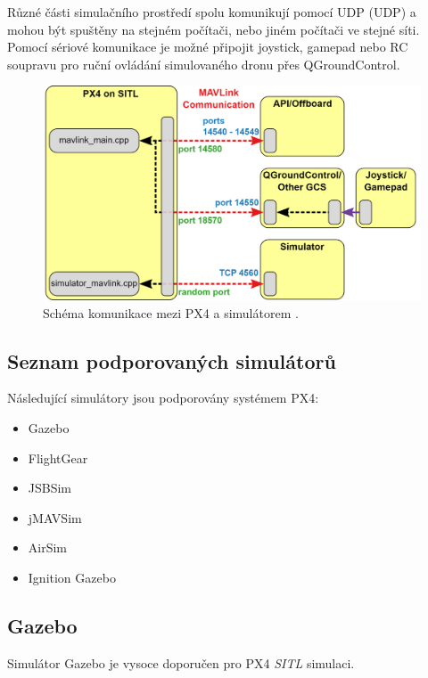 Různé části simulačního prostředí spolu komunikují pomocí \acs{UDP} (\acl{UDP}) a mohou být spuštěny na stejném počítači, nebo jiném počítači ve stejné síti. Pomocí sériové komunikace je možné připojit joystick, gamepad nebo RC soupravu pro ruční ovládání simulovaného dronu přes QGroundControl.

\begin{figure}[!ht]
  \begin{center}
    \includegraphics[scale=0.32]{obrazky/SIM2}
  \end{center}
  \caption[Schéma komunikace mezi PX4 a simulátorem]{Schéma komunikace mezi PX4 a simulátorem \cite{PX4docs}.}
  \label{fig:SIM2}
\end{figure}

\subsection{Seznam podporovaných simulátorů}

Následující simulátory jsou podporovány systémem PX4:

\begin{itemize}
    \item Gazebo
    \item FlightGear
    \item JSBSim
    \item jMAVSim
    \item AirSim
    \item Ignition Gazebo
\end{itemize}

\subsection{Gazebo}

Simulátor Gazebo je vysoce doporučen pro PX4 \textit{\acl{SITL}} simulaci.

